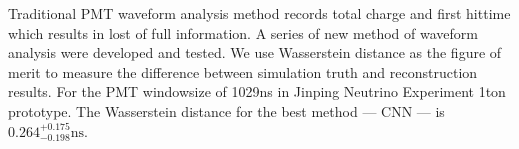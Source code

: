 Traditional PMT waveform analysis method records total charge and first hittime which results in lost of full information. A series of new method of waveform analysis were developed and tested. We use Wasserstein distance as the figure of merit to measure the difference between simulation truth and reconstruction results. For the PMT windowsize of 1029ns in Jinping Neutrino Experiment 1ton prototype. The Wasserstein distance for the best method --- CNN --- is $0.264^{+0.175}_{-0.198}\mathrm{ns}$. 